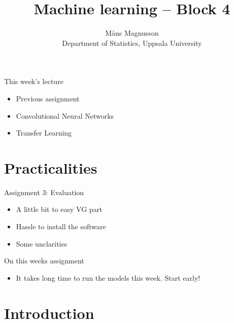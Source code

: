 \documentclass[10pt]{beamer}
\title[]{{\color{black}Machine learning -- Block 4}}
\author[]{M{\aa}ns Magnusson\\Department of Statistics, Uppsala University}
\date{\currentsemester}
\begin{document}
\frame{\titlepage
}



\begin{frame}{This week's lecture}
\begin{itemize}
\item Previous assignment
\item Convolutional Neural Networks
\item Transfer Learning
\end{itemize}
\end{frame}




\section{Practicalities}

\begin{frame}{Assignment 3: Evaluation}

\begin{itemize}
\item A little bit to easy VG part
\item Hassle to install the software
\item Some unclarities
\end{itemize}

\end{frame}

\begin{frame}{On this weeks assignment}
\begin{itemize}
\item It takes long time to run the models this week. Start early!
\end{itemize}
\end{frame}


\section{Introduction}
\frame{\sectionpage}
\end{document}
